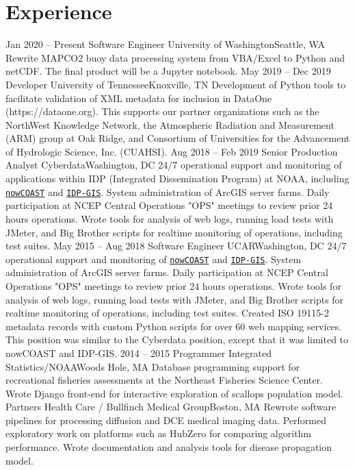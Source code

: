\documentclass[11pt]{moderncv}  %
\begin{document}
\section{Experience}
\cventry
{Jan 2020 -- Present}
{Software Engineer}
{University of Washington}{Seattle, WA}{}
{
Rewrite MAPCO2 buoy data processing system from VBA/Excel to Python and netCDF.  The final product will be a Jupyter notebook.
}
\cventry
{May 2019 -- Dec 2019}
{Developer}
{University of Tennessee}{Knoxville, TN}{}
{
Development of Python tools to facilitate validation of XML metadata for inclusion in DataOne (https://dataone.org).  This supports our partner organizations such as the NorthWest Knowledge Network, the Atmospheric Radiation and Measurement (ARM) group at Oak Ridge, and Consortium of Universities for the Advancement of Hydrologic Science, Inc. (CUAHSI).
}
\cventry
{Aug 2018 -- Feb 2019}
{Senior Production Analyst}
{Cyberdata}{Washington, DC}{}
{
24/7 operational support and monitoring of applications within IDP (Integrated Dissemination Program) at NOAA, including \href{https://nowcoast.noaa.gov}{\texttt{nowCOAST}} and \href{https://idpgis.ncep.noaa.gov}{\texttt{IDP-GIS}}.  System administration of ArcGIS server farms.  Daily participation at NCEP Central Operations "OPS" meetings to review prior 24 hours operations.  Wrote tools for analysis of web logs, running load tests with JMeter, and Big Brother scripts for realtime monitoring of operations, including test suites.  
}
\cventry
{May 2015 -- Aug 2018}
{Software Engineer}
{UCAR}{Washington, DC}{}
{
	24/7 operational support and monitoring of 
	\href{https://nowcoast.noaa.gov}{\texttt{nowCOAST}}
	and
	\href{https://idpgis.ncep.noaa.gov}{\texttt{IDP-GIS}}.
	System administration of ArcGIS server farms.  Daily
	participation at NCEP Central Operations "OPS" meetings to
	review prior 24 hours operations.  Wrote tools for analysis
	of web logs, running load tests with JMeter, and Big Brother
	scripts for realtime monitoring of operations, including
	test suites.  Created ISO 19115-2 metadata records with
	custom Python scripts for over 60 web mapping services.
	This position was similar to the Cyberdata position, except that
	it was limited to nowCOAST and IDP-GIS.
}
\cventry
{2014 -- 2015}
{Programmer}
{Integrated Statistics/NOAA}{Woods Hole, MA}{}
{
Database programming support for recreational fisheries assessments
at the Northeast Fisheries Science Center. Wrote Django front-end for
interactive exploration of scallops population model.
}
{
	Partners Health Care / Bullfinch Medical Group}{Boston, MA}{}{
    Rewrote software pipelines for processing diffusion and DCE medical
    imaging data.  Performed exploratory work on platforms such as
    HubZero  for comparing algorithm performance. Wrote documentation
    and analysis tools for disease propagation model.
}
\end{document}
